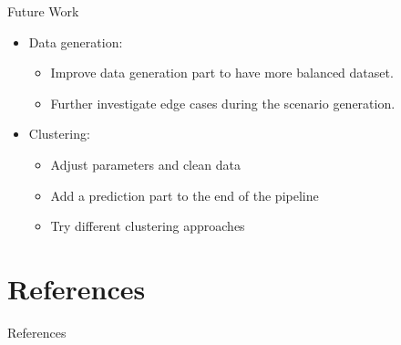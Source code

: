 \documentclass[shortpres]{beamer}
\begin{document}
\begin{frame}{Future Work}

\begin{itemize} 
\item Data generation:
	\begin{itemize}
	\item Improve data generation part to have more balanced dataset.
	\item Further investigate edge cases during the scenario generation.
	\end{itemize}
\item Clustering:
	\begin{itemize}
        \item Adjust parameters and clean data
        \item Add a prediction part to the end of the pipeline
	\item Try different clustering approaches
    \end{itemize}
\end{itemize}

\end{frame}

\section{References}

\begin{frame}{References}
	\printbibliography
\end{frame}
\end{document}
